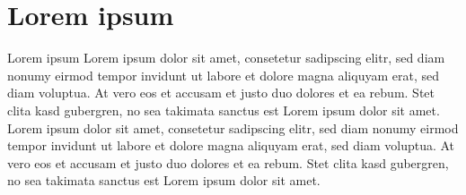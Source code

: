 \documentclass{beamer}
\begin{document}
\section{Lorem ipsum}
\begin{frame}{Lorem ipsum}
	Lorem ipsum dolor sit amet, consetetur sadipscing elitr, sed diam nonumy eirmod tempor invidunt ut labore et dolore magna aliquyam erat, sed diam voluptua. At vero eos et accusam et justo duo dolores et ea rebum. Stet clita kasd gubergren, no sea takimata sanctus est Lorem ipsum dolor sit amet. Lorem  ipsum dolor sit amet, consetetur sadipscing elitr, sed diam nonumy eirmod tempor invidunt ut labore et dolore magna aliquyam erat, sed diam voluptua. At vero eos et accusam et justo duo dolores et ea rebum. Stet clita kasd gubergren, no sea takimata sanctus est Lorem ipsum dolor sit amet.
\end{frame}
\end{document}
